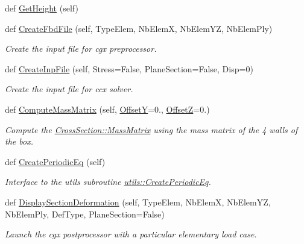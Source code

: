 \begin{DoxyCompactItemize}
\item 
def \hyperlink{classgebtaero_1_1_composite_box_1_1_composite_box_a8ca332752a2b78ca0ba4c65f99ab1b62}{Get\+Height} (self)
\item 
def \hyperlink{classgebtaero_1_1_composite_box_1_1_composite_box_af2465d364bb51056af14fde13bd05d4a}{Create\+Fbd\+File} (self, Type\+Elem, Nb\+ElemX, Nb\+Elem\+YZ, Nb\+Elem\+Ply)
\begin{DoxyCompactList}\small\item\em Create the input file for cgx preprocessor. \end{DoxyCompactList}\item 
def \hyperlink{classgebtaero_1_1_composite_box_1_1_composite_box_a005e7c9de0e4307ad9ff7ed4e8f7c8a4}{Create\+Inp\+File} (self, Stress=False, Plane\+Section=False, Disp=0)
\begin{DoxyCompactList}\small\item\em Create the input file for ccx solver. \end{DoxyCompactList}\item 
def \hyperlink{classgebtaero_1_1_composite_box_1_1_composite_box_a6b944eeef7002377d7b83c5dd6ae6550}{Compute\+Mass\+Matrix} (self, \hyperlink{classgebtaero_1_1_composite_box_1_1_composite_box_a26fcf7763030afb28f45f2354125c352}{OffsetY}=0., \hyperlink{classgebtaero_1_1_composite_box_1_1_composite_box_a50e38078e66133a95f34f2d9176329d9}{OffsetZ}=0.)
\begin{DoxyCompactList}\small\item\em Compute the \hyperlink{classgebtaero_1_1_cross_section_1_1_cross_section_ae9be8649853163b2b4dfdaa3584d9f78}{Cross\+Section\+::\+Mass\+Matrix} using the mass matrix of the 4 walls of the box. \end{DoxyCompactList}\item 
def \hyperlink{classgebtaero_1_1_composite_box_1_1_composite_box_a9328777b54ead0767f0075fe599b09d9}{Create\+Periodic\+Eq} (self)
\begin{DoxyCompactList}\small\item\em Interface to the utils subroutine \hyperlink{namespacegebtaero_1_1utils_a4f786ecbe66af9f64c802adf4e0a990f}{utils\+::\+Create\+Periodic\+Eq}. \end{DoxyCompactList}\item 
def \hyperlink{classgebtaero_1_1_composite_box_1_1_composite_box_a024d2118868a02e7e6218300435148e0}{Display\+Section\+Deformation} (self, Type\+Elem, Nb\+ElemX, Nb\+Elem\+YZ, Nb\+Elem\+Ply, Def\+Type, Plane\+Section=False)
\begin{DoxyCompactList}\small\item\em Launch the cgx postprocessor with a particular elementary load case. \end{DoxyCompactList}\end{DoxyCompactItemize}
